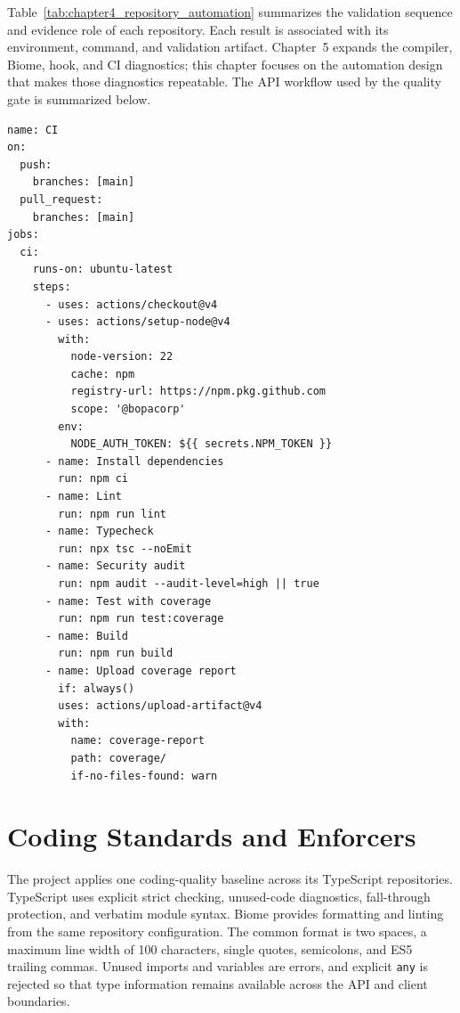 \documentclass[letterpaper%
, oneside%
, 12pt%
, memoireprojet%
, english%
,creativecommons,hyperref, withAlgo2e %
]{thETS}
\newenvironment{chaptercodeblock}{%
    \par\noindent\begin{minipage}{\linewidth}%
}{%
    \end{minipage}\par%
}
\begin{document}
Table~\ref{tab:chapter4_repository_automation} summarizes the validation sequence and evidence
role of each repository. Each result is associated with its environment, command, and validation
artifact. Chapter~5 expands the compiler, Biome, hook, and CI diagnostics; this chapter focuses on
the automation design that makes those diagnostics repeatable.
The API workflow used by the quality gate is summarized below.
\begin{chaptercodeblock}
\begin{lstlisting}[style=chaptercode,language=chapteryaml,basicstyle=\ttfamily\scriptsize,framesep=3pt,aboveskip=0.3\baselineskip,belowskip=0.3\baselineskip,caption={Complete API continuous-integration workflow},label={lst:chapter4_ci_pipeline}]
name: CI
on:
  push:
    branches: [main]
  pull_request:
    branches: [main]
jobs:
  ci:
    runs-on: ubuntu-latest
    steps:
      - uses: actions/checkout@v4
      - uses: actions/setup-node@v4
        with:
          node-version: 22
          cache: npm
          registry-url: https://npm.pkg.github.com
          scope: '@bopacorp'
        env:
          NODE_AUTH_TOKEN: ${{ secrets.NPM_TOKEN }}
      - name: Install dependencies
        run: npm ci
      - name: Lint
        run: npm run lint
      - name: Typecheck
        run: npx tsc --noEmit
      - name: Security audit
        run: npm audit --audit-level=high || true
      - name: Test with coverage
        run: npm run test:coverage
      - name: Build
        run: npm run build
      - name: Upload coverage report
        if: always()
        uses: actions/upload-artifact@v4
        with:
          name: coverage-report
          path: coverage/
          if-no-files-found: warn
\end{lstlisting}
\end{chaptercodeblock}

\section{Coding Standards and Enforcers}
The project applies one coding-quality baseline across its TypeScript repositories. TypeScript uses
explicit strict checking, unused-code diagnostics, fall-through protection, and verbatim module
syntax. Biome provides formatting and linting from the same repository configuration. The common
format is two spaces, a maximum line width of 100 characters, single quotes, semicolons, and ES5
trailing commas. Unused imports and variables are errors, and explicit \texttt{any} is rejected so
that type information remains available across the API and client boundaries.
\end{document}
